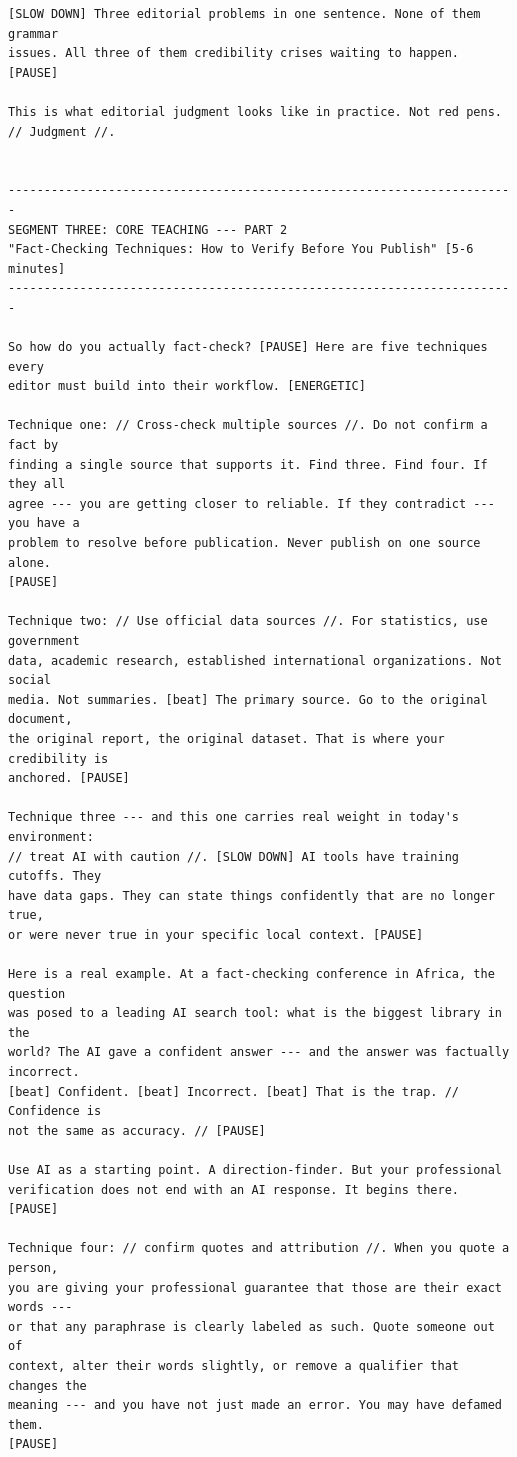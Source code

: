{\begin{Verbatim}
[SLOW DOWN] Three editorial problems in one sentence. None of them grammar
issues. All three of them credibility crises waiting to happen. [PAUSE]

This is what editorial judgment looks like in practice. Not red pens.
// Judgment //.


-----------------------------------------------------------------------
SEGMENT THREE: CORE TEACHING --- PART 2
"Fact-Checking Techniques: How to Verify Before You Publish" [5-6 minutes]
-----------------------------------------------------------------------

So how do you actually fact-check? [PAUSE] Here are five techniques every
editor must build into their workflow. [ENERGETIC]

Technique one: // Cross-check multiple sources //. Do not confirm a fact by
finding a single source that supports it. Find three. Find four. If they all
agree --- you are getting closer to reliable. If they contradict --- you have a
problem to resolve before publication. Never publish on one source alone.
[PAUSE]

Technique two: // Use official data sources //. For statistics, use government
data, academic research, established international organizations. Not social
media. Not summaries. [beat] The primary source. Go to the original document,
the original report, the original dataset. That is where your credibility is
anchored. [PAUSE]

Technique three --- and this one carries real weight in today's environment:
// treat AI with caution //. [SLOW DOWN] AI tools have training cutoffs. They
have data gaps. They can state things confidently that are no longer true,
or were never true in your specific local context. [PAUSE]

Here is a real example. At a fact-checking conference in Africa, the question
was posed to a leading AI search tool: what is the biggest library in the
world? The AI gave a confident answer --- and the answer was factually incorrect.
[beat] Confident. [beat] Incorrect. [beat] That is the trap. // Confidence is
not the same as accuracy. // [PAUSE]

Use AI as a starting point. A direction-finder. But your professional
verification does not end with an AI response. It begins there. [PAUSE]

Technique four: // confirm quotes and attribution //. When you quote a person,
you are giving your professional guarantee that those are their exact words ---
or that any paraphrase is clearly labeled as such. Quote someone out of
context, alter their words slightly, or remove a qualifier that changes the
meaning --- and you have not just made an error. You may have defamed them.
[PAUSE]


\end{Verbatim}}
